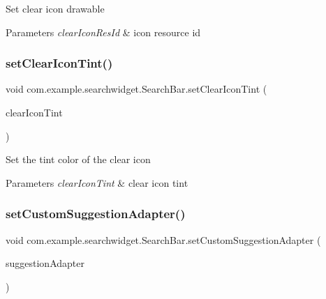 Set clear icon drawable


\begin{DoxyParams}{Parameters}
{\em clear\+Icon\+Res\+Id} & icon resource id \\
\hline
\end{DoxyParams}
\mbox{\label{classcom_1_1example_1_1searchwidget_1_1_search_bar_aed6f9a5ee6a225ee697304e6a3ed5d5d}} 
\subsubsection{\texorpdfstring{setClearIconTint()}{setClearIconTint()}}
{\footnotesize\ttfamily void com.\+example.\+searchwidget.\+Search\+Bar.\+set\+Clear\+Icon\+Tint (\begin{DoxyParamCaption}\item[{int}]{clear\+Icon\+Tint }\end{DoxyParamCaption})}

Set the tint color of the clear icon


\begin{DoxyParams}{Parameters}
{\em clear\+Icon\+Tint} & clear icon tint \\
\hline
\end{DoxyParams}
\mbox{\label{classcom_1_1example_1_1searchwidget_1_1_search_bar_ac3d6b348b32c8129fca764c3cfe9b810}} 
\subsubsection{\texorpdfstring{setCustomSuggestionAdapter()}{setCustomSuggestionAdapter()}}
{\footnotesize\ttfamily void com.\+example.\+searchwidget.\+Search\+Bar.\+set\+Custom\+Suggestion\+Adapter (\begin{DoxyParamCaption}\item[{\mbox{\hyperlink{classcom_1_1example_1_1searchwidget_1_1adapter_1_1_suggestions_adapter}{Suggestions\+Adapter}}}]{suggestion\+Adapter }\end{DoxyParamCaption})}

